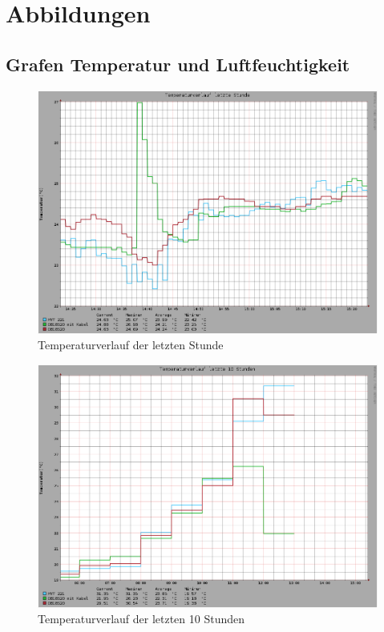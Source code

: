 \chapter{Abbildungen}

\section{Grafen Temperatur und Luftfeuchtigkeit}
\label{Anhang_Abbildung_Temperaturverlauf}
\begin{figure}[!h] 
  \centering
     \includegraphics[scale=.3]{BilderAllgemein/Bilder/TemperaturStunde.png}
  \caption{Temperaturverlauf der letzten Stunde}
\end{figure}

\begin{figure}[!h] 
  \centering
     \includegraphics[scale=.3]{BilderAllgemein/Bilder/TemperaturTag.png}
  \caption{Temperaturverlauf der letzten 10 Stunden}
\end{figure}\newpage


